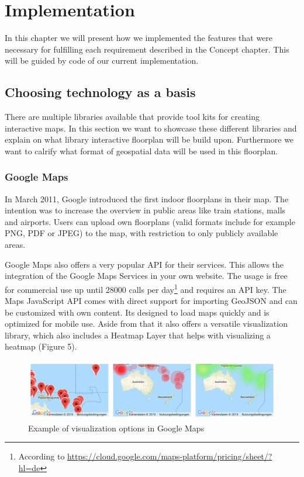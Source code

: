 \section{Implementation}
In this chapter we will present how we implemented the features that were necessary for fulfilling each requirement described in the Concept chapter. This will be guided by code of our current implementation.

\subsection{Choosing technology as a basis}

There are multiple libraries available that provide tool kits for creating interactive maps. In this section we want to showcase these different libraries and explain on what library interactive floorplan will be build upon. Furthermore we want to calrify what format of geospatial data will be used in this floorplan.

\subsubsection{Google Maps}
\label{Google Maps}

In March 2011, Google introduced the first indoor floorplans in their map. The intention was to increase the overview in public areas like train stations, malls and airports.
Users can upload own floorplans (valid formats include for example PNG, PDF or JPEG) to the map, with restriction to only publicly available areas.

Google Maps also offers a very popular API for their services. This allows the integration of the Google Maps Services in your own website. The usage is free for commercial use up until 28000 calls per day\footnote{According to \url{https://cloud.google.com/maps-platform/pricing/sheet/?hl=de}} and requires an API key.
The Maps JavaScript API comes with direct support for importing GeoJSON and can be customized with own content. Its designed to load maps quickly and is optimized for mobile use. Aside from that it also offers a versatile visualization library, which also includes a Heatmap Layer that helps with visualizing a heatmap (Figure 5).

\begin{figure}[!hb]
	\centering
	\includegraphics[width=1\linewidth]{images/GoogleMapsHeatmap}
	\caption{Example of visualization options in Google Maps}
	\label{fig:GoogleMapsHeatmap}
\end{figure}

